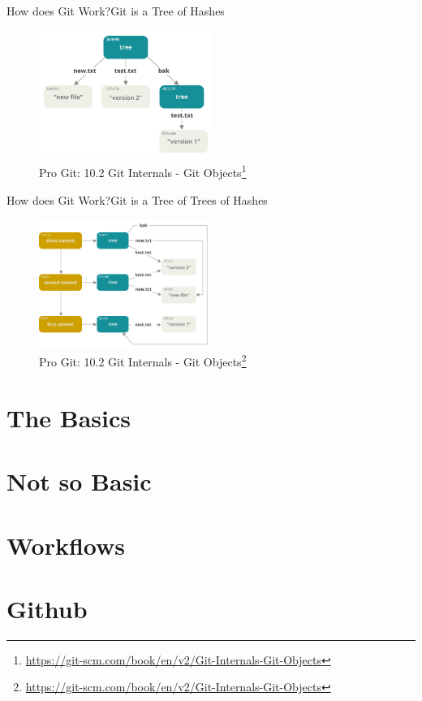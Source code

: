 \documentclass[aspectratio=169]{beamer}
\begin{document}
\begin{frame}{How does Git Work?}{Git is a Tree of Hashes}
\begin{figure}
	\centering
	\includegraphics[width=0.5\textwidth]{data-model-2}
	\caption{
		Pro Git: 10.2 Git Internals - Git Objects\footnote{\url{https://git-scm.com/book/en/v2/Git-Internals-Git-Objects}}
	}
\end{figure}
\end{frame}

\begin{frame}{How does Git Work?}{Git is a Tree of Trees of Hashes}
\begin{figure}
	\centering
	\includegraphics[width=0.5\textwidth]{data-model-3}
	\caption{
		Pro Git: 10.2 Git Internals - Git Objects\footnote{\url{https://git-scm.com/book/en/v2/Git-Internals-Git-Objects}}
	}
\end{figure}
\end{frame}

\section{The Basics}
\section{Not so Basic}
\section{Workflows}
\section{Github}
\end{document}
